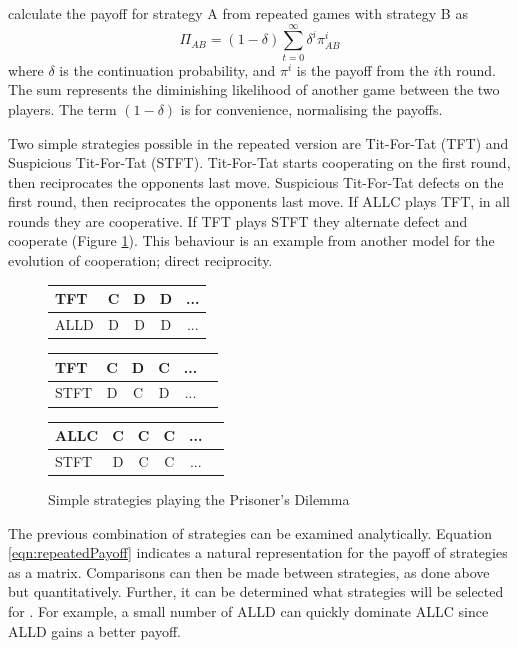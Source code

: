 \documentclass[a4paper,11pt,bcshonoursthesis,singlespace,twoside,thesisdraft,pdflatex]{cssethesis}
\begin{document}
\citet{garcia:PLoSOne:2012} calculate the payoff for strategy A from repeated games with strategy B as
\begin{equation}
\label{eqn:repeatedPayoff}
\Pi_{AB}=(1-\delta)\sum^{\infty}_{t=0} \delta^i\pi^i_{AB}
\end{equation}
where $\delta$ is the continuation probability, and $\pi^i$ is the payoff from the $i$th round. 
The sum represents the diminishing likelihood of another game between the two players. 
The term $(1-\delta)$ is for convenience, normalising the payoffs.
 
Two simple strategies possible in the repeated version are Tit-For-Tat (TFT) and Suspicious Tit-For-Tat (STFT). 
Tit-For-Tat starts cooperating on the first round, then reciprocates the opponents last move. 
Suspicious Tit-For-Tat defects on the first round, then reciprocates the opponents last move. 
If ALLC plays TFT, in all rounds they are cooperative.  
If TFT plays STFT they alternate defect and cooperate (Figure \ref{table:reciprocity}). 
This behaviour is an example from another model for the evolution of cooperation; direct reciprocity. 

\begin{figure}[h]
\centering
\captionsetup{justification=centering}
\begin{tabular}{|l|c|c|c|c|}
\hline
TFT & C & D & D&...\\
\hline
ALLD & D & D &D&...\\
\hline
\end{tabular}\hfill
\begin{tabular}{|l|c|c|c|c|c|}
\hline
TFT & C & D&C&...\\
\hline
STFT & D & C&D&...\\
\hline
\end{tabular}\hfill
\begin{tabular}{|l|c|c|c|c|c|}
\hline
ALLC & C & C&C&...\\
\hline
STFT & D & C&C&...\\
\hline
\end{tabular}\hfill
\caption{Simple strategies playing the Prisoner's Dilemma}
\label{table:reciprocity}
\end{figure}

The previous combination of strategies can be examined analytically. 
Equation \ref{eqn:repeatedPayoff} indicates a natural representation for the payoff of strategies as a matrix. 
Comparisons can then be made between strategies, as done above but quantitatively. 
Further, it can be determined what strategies will be selected for \citep{imhof:PNAS:2005}. 
For example, a small number of ALLD can quickly dominate ALLC since ALLD gains a better payoff.
\end{document}
